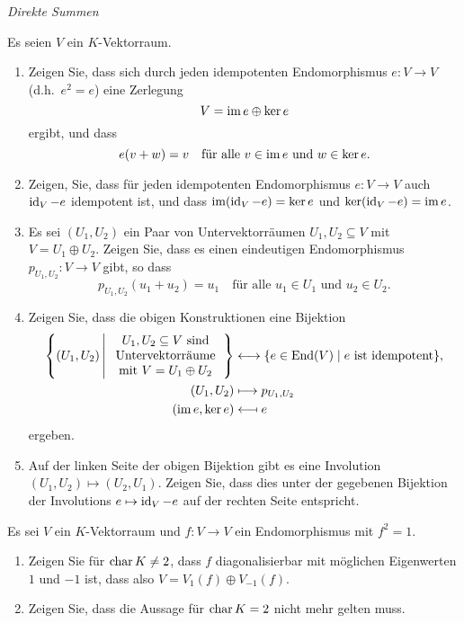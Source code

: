 \emph{Direkte Summen}


\begin{question}
  Es seien $V$ ein $K$-Vektorraum.
  \begin{enumerate}[leftmargin=*]
    \item
      Zeigen Sie, dass sich durch jeden idempotenten Endomorphismus $e \colon V \to V$ (d.h.\ $e^2 = e$) eine Zerlegung
      \[
        V = \operatorname{im} e \oplus \ker e
      \]
      ergibt, und dass
      \[
        e(v + w) = v
        \quad
        \text{für alle $v \in \operatorname{im} e$ und $w \in \ker e$}.
      \]
    \item
      Zeigen, Sie, dass für jeden idempotenten Endomorphismus $e \colon V \to V$ auch $\operatorname{id}_V - e$ idempotent ist, und dass $\operatorname{im} (\operatorname{id}_V - e) = \ker e$ und $\ker (\operatorname{id}_V - e) = \operatorname{im} e$.
    \item
      Es sei $(U_1, U_2)$ ein Paar von Untervektorräumen $U_1, U_2 \subseteq V$ mit $V = U_1 \oplus U_2$.
      Zeigen Sie, dass es einen eindeutigen Endomorphismus $p_{U_1, U_2} \colon V \to V$ gibt, so dass
      \[
          p_{U_1, U_2}(u_1 + u_2)
        = u_1
        \quad
        \text{für alle $u_1 \in U_1$ und $u_2 \in U_2$}.
      \]
    \item
      Zeigen Sie, dass die obigen Konstruktionen eine Bijektion
      \begin{align*}
        \left\{
          (U_1, U_2)
          \,\middle|\,
          \begin{tabular}{c}
            $U_1, U_2 \subseteq V$ sind \\
            Untervektorräume            \\
            mit $V = U_1 \oplus U_2$
          \end{tabular}
        \right\}
        &\longleftrightarrow
        \{ e \in \End(V) \mid \text{$e$ ist idempotent} \},
      \\
        (U_1, U_2) &\longmapsto p_{U_1, U_2}
      \\
        (\im e, \ker e) &\longmapsfrom e
      \end{align*}
      ergeben.
    \item
      Auf der linken Seite der obigen Bijektion gibt es eine Involution $(U_1, U_2) \mapsto (U_2, U_1)$.
      Zeigen Sie, dass dies unter der gegebenen Bijektion der Involutions $e \mapsto \operatorname{id}_V - e$ auf der rechten Seite entspricht.
  \end{enumerate}
\end{question}


\begin{question}
  Es sei $V$ ein $K$-Vektorraum und $f \colon V \to V$ ein Endomorphismus mit $f^2 = 1$.
  \begin{enumerate}[leftmargin=*]
    \item
      Zeigen Sie für $\operatorname{char} K \neq 2$, dass $f$ diagonalisierbar mit möglichen Eigenwerten $1$ und $-1$ ist, dass also $V = V_1(f) \oplus V_{-1}(f)$.
    \item
      Zeigen Sie, dass die Aussage für $\operatorname{char} K = 2$ nicht mehr gelten muss.
  \end{enumerate}
\end{question}


